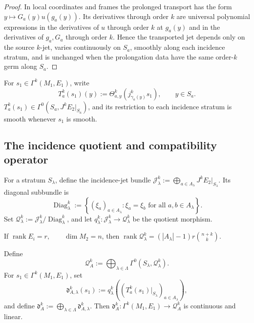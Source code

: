 \documentclass[11pt]{article}
\theoremstyle{plain}
\theoremstyle{definition}
\begin{document}
\begin{proof}
In local coordinates and frames the prolonged transport has the form \(y\mapsto G_a(y)u(g_a(y))\). Its derivatives through order \(k\) are universal polynomial expressions in the derivatives of \(u\) through order \(k\) at \(g_a(y)\) and in the derivatives of \(g_a,G_a\) through order \(k\). Hence the transported jet depends only on the source \(k\)-jet, varies continuously on \(S_a\), smoothly along each incidence stratum, and is unchanged when the prolongation data have the same order-\(k\) germ along \(S_a\).
\end{proof}

For
\(s_1\in\Gamma^k(M_1,E_1)\),
write
\[
  T_a^k(s_1)(y)
  :=
  \Theta_{a,y}^k
  \left(
    j_{\gamma_a(y)}^k s_1
  \right),
  \qquad
  y\in S_a.
\]
\(T_a^k(s_1) \in \Gamma^0 \left( S_a, J^kE_2|_{S_a} \right)\),
and its restriction to each incidence stratum is smooth whenever
\(s_1\) is smooth.

\subsection{The incidence quotient and compatibility operator}
\label{subsec:incidence-defect}

For a stratum \(S_\lambda\), define the incidence-jet bundle
\(\mathcal J_\lambda^k := \bigoplus_{a\in A_\lambda} J^kE_2|_{S_\lambda}\).
Its diagonal subbundle is
\[
  \operatorname{Diag}_\lambda^k
  :=
  \left\{
    (\xi_a)_{a\in A_\lambda}:
    \xi_a=\xi_b
    \text{ for all }a,b\in A_\lambda
  \right\}.
\]
Set
\(\mathcal Q_\lambda^k := \mathcal J_\lambda^k/ \operatorname{Diag}_\lambda^k\),
and let \(q_\lambda^k: \mathcal J_\lambda^k \longrightarrow \mathcal Q_\lambda^k\) be the quotient morphism.

If
\(\operatorname{rank}E_i=r, \qquad \dim M_2=n\),
then
\(\operatorname{rank}\mathcal Q_\lambda^k = (|A_\lambda|-1) r \binom{n+k}{k}\).

Define
\[
  \mathcal Q_A^k
  :=
  \bigoplus_{\lambda\in\Lambda}
  \Gamma^0
  \left(
    S_\lambda,
    \mathcal Q_\lambda^k
  \right).
\]
For
\(s_1\in\Gamma^k(M_1,E_1)\),
set
\[
  \mathfrak d_{A,\lambda}^k(s_1)
  :=
  q_\lambda^k
  \left(
    \left(
      T_a^k(s_1)|_{S_\lambda}
    \right)_{a\in A_\lambda}
  \right),
\]
and define
\(\mathfrak d_A^k := \bigoplus_{\lambda\in\Lambda} \mathfrak d_{A,\lambda}^k\).
Then \(\mathfrak d_A^k: \Gamma^k(M_1,E_1) \longrightarrow \mathcal Q_A^k\) is continuous and linear.
\end{document}
